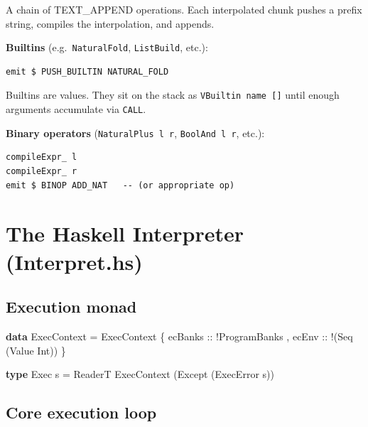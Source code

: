 \documentclass[]{article}
\newenvironment{Shaded}{}{}
\newcommand{\DataTypeTok}[1]{\textcolor[rgb]{0.56,0.13,0.00}{#1}}
\newcommand{\KeywordTok}[1]{\textcolor[rgb]{0.00,0.44,0.13}{\textbf{#1}}}
\newcommand{\NormalTok}[1]{#1}
\newcommand{\OperatorTok}[1]{\textcolor[rgb]{0.40,0.40,0.40}{#1}}
\newcommand{\OtherTok}[1]{\textcolor[rgb]{0.00,0.44,0.13}{#1}}
\begin{document}
A chain of TEXT\_APPEND operations. Each interpolated chunk pushes a prefix
string, compiles the interpolation, and appends.

\textbf{Builtins} (e.g.~\texttt{NaturalFold}, \texttt{ListBuild}, etc.):

\begin{verbatim}
emit $ PUSH_BUILTIN NATURAL_FOLD
\end{verbatim}

Builtins are values. They sit on the stack as \texttt{VBuiltin\ name\ {[}{]}}
until enough arguments accumulate via \texttt{CALL}.

\textbf{Binary operators} (\texttt{NaturalPlus\ l\ r}, \texttt{BoolAnd\ l\ r},
etc.):

\begin{verbatim}
compileExpr_ l
compileExpr_ r
emit $ BINOP ADD_NAT   -- (or appropriate op)
\end{verbatim}

\section{The Haskell Interpreter
(Interpret.hs)}\label{the-haskell-interpreter-interpret.hs}

\subsection{Execution monad}\label{execution-monad}

\begin{Shaded}
\begin{Highlighting}[]
\KeywordTok{data} \DataTypeTok{ExecContext} \OtherTok{=} \DataTypeTok{ExecContext}
\NormalTok{    \{}\OtherTok{ ecBanks ::} \OperatorTok{!}\DataTypeTok{ProgramBanks}
\NormalTok{    ,}\OtherTok{ ecEnv   ::} \OperatorTok{!}\NormalTok{(}\DataTypeTok{Seq}\NormalTok{ (}\DataTypeTok{Value} \DataTypeTok{Int}\NormalTok{))}
\NormalTok{    \}}

\KeywordTok{type} \DataTypeTok{Exec}\NormalTok{ s }\OtherTok{=} \DataTypeTok{ReaderT} \DataTypeTok{ExecContext}\NormalTok{ (}\DataTypeTok{Except}\NormalTok{ (}\DataTypeTok{ExecError}\NormalTok{ s))}
\end{Highlighting}
\end{Shaded}

\subsection{Core execution loop}\label{core-execution-loop}
\end{document}
